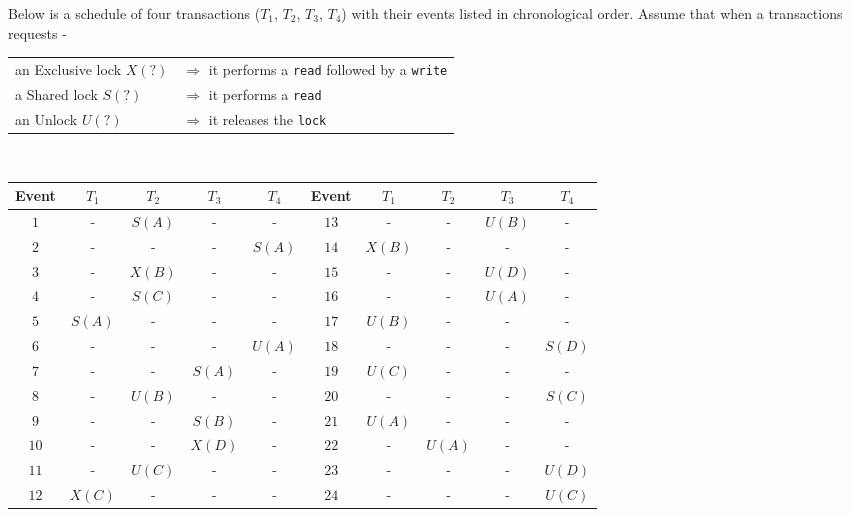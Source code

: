 


\question Below is a schedule of four transactions ($T_1$, $T_2$, 
$T_3$, $T_4$) with their events listed in chronological order. 
Assume that when a transactions requests -\\
\watchout
\begin{tabular}{ll}
an Exclusive lock $X(?)$ &$\Rightarrow$ it performs a \texttt{read} followed by a \texttt{write} \\
a  Shared lock $S(?)$    &$\Rightarrow$ it performs a \texttt{read} \\
an Unlock $U(?)$         &$\Rightarrow$ it releases the \texttt{lock} \\
\end{tabular}
\\
\begin{tabular}{|c|c|c|c|c||c|c|c|c|c|}
  \hline
  Event & $T_1$ & $T_2$ & $T_3$ & $T_4$ &Event & $T_1$ & $T_2$ & $T_3$ & $T_4$ \\
  \hline
  $1$   & -     & $S(A)$& -     & -     &$13$  & -     & -     & $U(B)$& -     \\
  $2$   & -     & -     & -     & $S(A)$&$14$  & $X(B)$& -     & -     & -     \\
  $3$   & -     & $X(B)$& -     & -     &$15$  & -     & -     & $U(D)$& -     \\
  $4$   & -     & $S(C)$& -     & -     &$16$  & -     & -     & $U(A)$& -     \\
  $5$   & $S(A)$& -     & -     & -     &$17$  & $U(B)$& -     & -     & -     \\
  $6$   & -     & -     & -     & $U(A)$&$18$  & -     & -     & -     & $S(D)$\\
  $7$   & -     & -     & $S(A)$& -     &$19$  & $U(C)$& -     & -     & -     \\
  $8$   & -     & $U(B)$& -     & -     &$20$  & -     & -     & -     & $S(C)$\\
  $9$   & -     & -     & $S(B)$& -     &$21$  & $U(A)$& -     & -     & -     \\
  $10$  & -     & -     & $X(D)$& -     &$22$  & -     & $U(A)$& -     & -     \\
  $11$  & -     & $U(C)$& -     & -     &$23$  & -     & -     & -     & $U(D)$\\
  $12$  & $X(C)$& -     & -     & -     &$24$  & -     & -     & -     & $U(C)$\\
  \hline
\end{tabular}
\\

